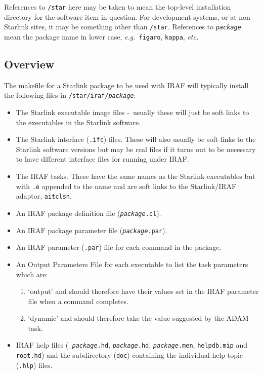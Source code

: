 \documentclass[twoside,11pt]{article}
\newcommand{\xlabel}[1]{}
\newcommand{\itfile}[2]{\texttt{\textit{#1}#2}}
\newcommand{\dash}{--}
\renewcommand{\dash}{-}
\begin{document}
References to \texttt{/star} here may be taken to mean the top-level
installation directory for the software item in question. For development
systems, or at non-Starlink sites, it may be something other than 
\texttt{/star}.
References to \texttt{\textit{package}} mean the package name in lower case, 
\textit{e.g.}\ \texttt{figaro}, \texttt{kappa}, \textit{etc.}

\subsection{\xlabel{overview}Overview}
The makefile for a Starlink package to be used with IRAF will typically 
install the following files in \texttt{/star/iraf/\textit{package}}:
\begin{itemize}
\item The Starlink executable image files \dash\ usually these will just be
soft links to the executables in the Starlink software.
\item The Starlink interface ({\texttt{.ifc}}) files. 
These will also usually be soft links to the Starlink software versions but 
may be real files if it turns out to be necessary to have different interface 
files for running under IRAF.
\item The IRAF tasks. These have the same names as the Starlink executables but
with \texttt{.e} appended to the name and are soft links to the Starlink/IRAF
adaptor, {\texttt{aitclsh}}.
\item An IRAF package definition file (\itfile{package}{.cl}).
\item An IRAF package parameter file (\itfile{package}{.par}).
\item An IRAF parameter (\texttt{.par}) file for each command in the package.
\item An Output Parameters File for each executable to list the task 
parameters which are:
\begin{enumerate}
\item `output' and should therefore have their values set in the
IRAF parameter file when a command completes.
\item `dynamic' and should therefore take the value suggested by the ADAM task.
\end{enumerate}
\item IRAF help files (\itfile{\_package}{.hd},
\itfile{package}{.hd}, 
\itfile{package}{.men}, \texttt{helpdb.mip} and \texttt{root.hd}) and the 
subdirectory (\texttt{doc}) containing the individual help topic 
(\texttt{.hlp}) files.
\end{itemize}
\end{document}
